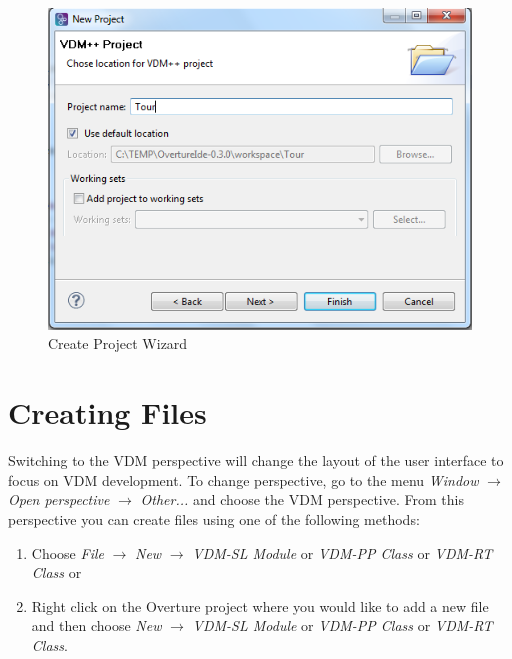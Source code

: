 \documentclass{overturerepchap}
\begin{document}
\begin{figure}[!htb]
	\begin{center}
	  \includegraphics[scale=0.8]{figures/CreateProjectWizard}
	  \caption[Create Project Wizard]{Create Project Wizard}
	  \label{fig:CreateProjectWizard}
	\end{center}
\end{figure}


\section{Creating Files}

Switching to the VDM perspective will change the layout of the user
interface to focus on VDM development. To change perspective, go to the menu
\emph{Window} $\rightarrow$ \emph{Open perspective} $\rightarrow$
\emph{Other...} and choose the VDM perspective.
From this perspective you can create files
using one of the following methods:

\begin{enumerate}
  \item Choose \emph{File} $\rightarrow$ \emph{New} $\rightarrow$
    \emph{VDM-SL Module} or
    \emph{VDM-PP Class} or
    \emph{VDM-RT Class} or
  \item Right click on the Overture project where you would like to
    add a new file and then choose \emph{New} $\rightarrow$
    \emph{VDM-SL Module} or \emph{VDM-PP Class} or \emph{VDM-RT Class}.
\end{enumerate}
\end{document}
